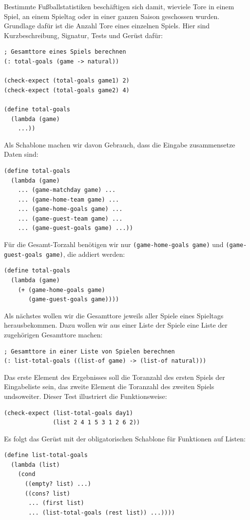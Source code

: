 Bestimmte Fußballstatistiken beschäftigen sich damit, wieviele Tore in
einem Spiel, an einem Spieltag oder in einer ganzen Saison geschossen
wurden.  Grundlage dafür ist die Anzahl Tore eines einzelnen Spiels.
Hier sind Kurzbeschreibung, Signatur, Tests und Gerüst dafür:
%
\begin{lstlisting}
; Gesamttore eines Spiels berechnen
(: total-goals (game -> natural))

(check-expect (total-goals game1) 2)
(check-expect (total-goals game2) 4)

(define total-goals
  (lambda (game)
    ...))
\end{lstlisting}
%
Als Schablone machen wir davon Gebrauch, dass die Eingabe
zusammensetze Daten sind:
%
\begin{lstlisting}
(define total-goals
  (lambda (game)
    ... (game-matchday game) ...
    ... (game-home-team game) ...
    ... (game-home-goals game) ...
    ... (game-guest-team game) ...
    ... (game-guest-goals game) ...))
\end{lstlisting}
%
Für die Gesamt-Torzahl benötigen wir nur
\lstinline{(game-home-goals game)}
und
\lstinline{(game-guest-goals game)}, die addiert werden:
%
\begin{lstlisting}
(define total-goals
  (lambda (game)
    (+ (game-home-goals game)
       (game-guest-goals game))))
\end{lstlisting}
%
Als nächstes wollen wir die Gesamttore jeweils aller Spiele eines
Spieltags herausbekommen.  Dazu wollen wir aus einer Liste der Spiele
eine Liste der zugehörigen Gesamttore machen:
%
\begin{lstlisting}
; Gesamttore in einer Liste von Spielen berechnen
(: list-total-goals ((list-of game) -> (list-of natural)))
\end{lstlisting}
%
Das erste Element des Ergebnisses soll die Toranzahl des ersten Spiels
der Eingabeliste sein, das zweite Element die Toranzahl des zweiten
Spiels undsoweiter.  Dieser Test illustriert die Funktionsweise:
%
\begin{lstlisting}
(check-expect (list-total-goals day1)
              (list 2 4 1 5 3 1 2 6 2))
\end{lstlisting}
%
Es folgt das Gerüst mit der obligatorischen Schablone für Funktionen
auf Listen:
%
\begin{lstlisting}
(define list-total-goals
  (lambda (list)
    (cond
      ((empty? list) ...)
      ((cons? list)
       ... (first list)
       ... (list-total-goals (rest list)) ...))))
\end{lstlisting}
